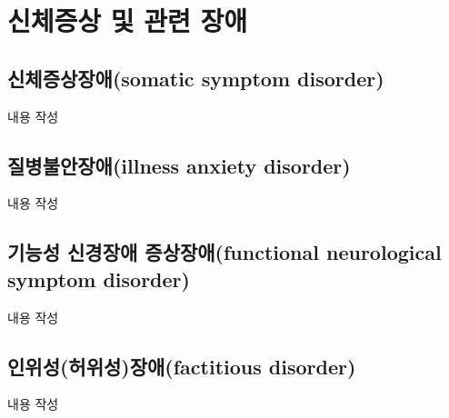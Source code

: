 \section{신체증상 및 관련 장애}

\subsection{신체증상장애(somatic symptom disorder)}
내용 작성

\subsection{질병불안장애(illness anxiety disorder)}
내용 작성

\subsection{기능성 신경장애 증상장애(functional neurological symptom disorder)}
내용 작성

\subsection{인위성(허위성)장애(factitious disorder)}
내용 작성
